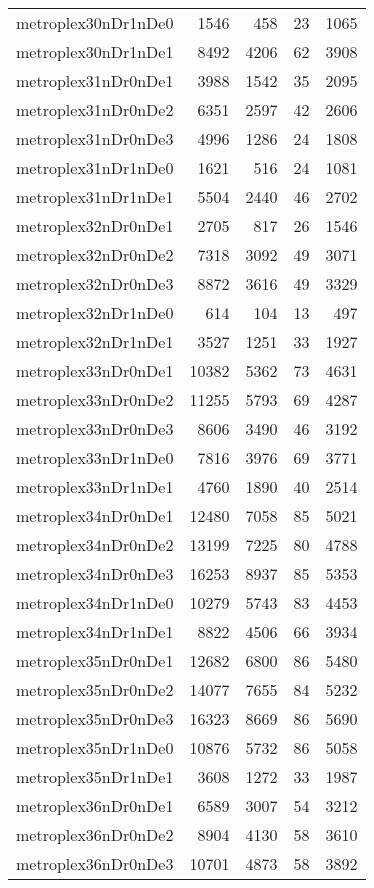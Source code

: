 \documentclass[../../../thesis.tex]{subfiles}
\begin{document}
\begin{longtable}{lrrrr}
metroplex30nDr1nDe0 & 1546 & 458 & 23 & 1065 \\
metroplex30nDr1nDe1 & 8492 & 4206 & 62 & 3908 \\
metroplex31nDr0nDe1 & 3988 & 1542 & 35 & 2095 \\
metroplex31nDr0nDe2 & 6351 & 2597 & 42 & 2606 \\
metroplex31nDr0nDe3 & 4996 & 1286 & 24 & 1808 \\
metroplex31nDr1nDe0 & 1621 & 516 & 24 & 1081 \\
metroplex31nDr1nDe1 & 5504 & 2440 & 46 & 2702 \\
metroplex32nDr0nDe1 & 2705 & 817 & 26 & 1546 \\
metroplex32nDr0nDe2 & 7318 & 3092 & 49 & 3071 \\
metroplex32nDr0nDe3 & 8872 & 3616 & 49 & 3329 \\
metroplex32nDr1nDe0 & 614 & 104 & 13 & 497 \\
metroplex32nDr1nDe1 & 3527 & 1251 & 33 & 1927 \\
metroplex33nDr0nDe1 & 10382 & 5362 & 73 & 4631 \\
metroplex33nDr0nDe2 & 11255 & 5793 & 69 & 4287 \\
metroplex33nDr0nDe3 & 8606 & 3490 & 46 & 3192 \\
metroplex33nDr1nDe0 & 7816 & 3976 & 69 & 3771 \\
metroplex33nDr1nDe1 & 4760 & 1890 & 40 & 2514 \\
metroplex34nDr0nDe1 & 12480 & 7058 & 85 & 5021 \\
metroplex34nDr0nDe2 & 13199 & 7225 & 80 & 4788 \\
metroplex34nDr0nDe3 & 16253 & 8937 & 85 & 5353 \\
metroplex34nDr1nDe0 & 10279 & 5743 & 83 & 4453 \\
metroplex34nDr1nDe1 & 8822 & 4506 & 66 & 3934 \\
metroplex35nDr0nDe1 & 12682 & 6800 & 86 & 5480 \\
metroplex35nDr0nDe2 & 14077 & 7655 & 84 & 5232 \\
metroplex35nDr0nDe3 & 16323 & 8669 & 86 & 5690 \\
metroplex35nDr1nDe0 & 10876 & 5732 & 86 & 5058 \\
metroplex35nDr1nDe1 & 3608 & 1272 & 33 & 1987 \\
metroplex36nDr0nDe1 & 6589 & 3007 & 54 & 3212 \\
metroplex36nDr0nDe2 & 8904 & 4130 & 58 & 3610 \\
metroplex36nDr0nDe3 & 10701 & 4873 & 58 & 3892 \\

\end{longtable}
\end{document}
